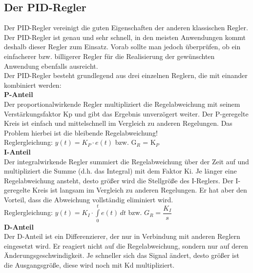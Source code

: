 {{\subsection{Der PID-Regler}
Der PID-Regler vereinigt die guten Eigenschaften der anderen klassischen Regler. Der PID-Regler ist genau und sehr schnell, in den meisten Anwendungen kommt deshalb dieser Regler zum Einsatz. Vorab sollte man jedoch überprüfen, ob ein einfacherer bzw. billigerer Regler für die Realisierung der gewünschten Anwendung ebenfalls ausreicht.
\\[5mm]
Der PID-Regler besteht grundlegend aus drei einzelnen Reglern, die mit einander kombiniert werden:
\\[5mm]
\textbf{P-Anteil}\\[1mm]
Der proportionalwirkende Regler multipliziert die Regelabweichung mit seinem Verstärkungsfaktor Kp und gibt das Ergebnis unverzögert weiter. Der P-geregelte Kreis ist einfach und mittelschnell im Vergleich zu anderen Regelungen. Das Problem hierbei ist die bleibende Regelabweichung!
\\[4mm]
Reglergleichung: \hspace{5mm} $y(t) = K_P \cdot e(t)$ \hspace{5mm} bzw. \hspace{5mm} G$_R$ = K$_P$
\\[7mm]

\textbf{I-Anteil}\\[1mm]
Der integralwirkende Regler summiert die Regelabweichung über der Zeit auf und multipliziert die Summe (d.h. das Integral) mit dem Faktor Ki. Je länger eine Regelabweichung ansteht, desto größer wird die Stellgröße des I-Reglers. Der I-geregelte Kreis ist langsam im Vergleich zu anderen Regelungen. Er hat aber den Vorteil, dass die Abweichung vollständig eliminiert wird.
\\[4mm]
Reglergleichung: \hspace{5mm} $y(t) = K_I \cdot \int\limits_{0}^{t} e(t) \,dt$ \hspace{5mm} bzw. \hspace{5mm} $G_R = \dfrac{K_I}{s}$
\\[7mm]

\textbf{D-Anteil}\\[1mm]
Der D-Anteil ist ein Differenzierer, der nur in Verbindung mit anderen Reglern eingesetzt wird. Er reagiert nicht auf die Regelabweichung, sondern nur auf deren Änderungsgeschwindigkeit. Je schneller sich das Signal ändert, desto größer ist die Ausgangsgröße, diese wird noch mit Kd multipliziert.

}}
